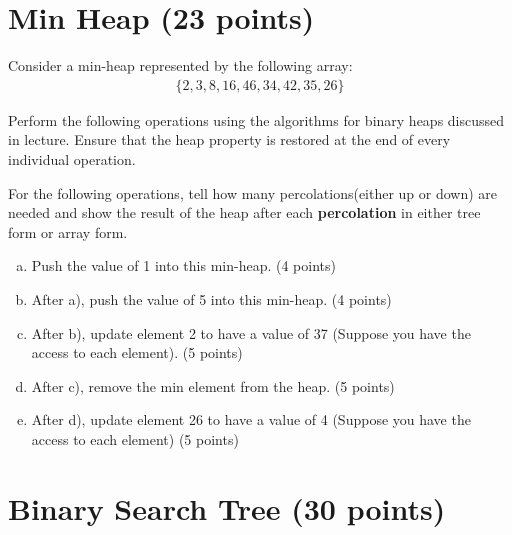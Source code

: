 \documentclass[11pt]{exam}
\begin{document}
\section{Min Heap (23 points)}
Consider a min-heap represented by the following array:
\begin{align*}
\{2, 3, 8, 16, 46, 34, 42, 35, 26\}
\end{align*}

Perform the following operations using the algorithms for binary heaps discussed in lecture. Ensure that the heap property is restored at the end of every individual operation.

For the following operations, tell how many percolations(either up or down) are needed and show the result of the heap after each \textbf{percolation} in either tree form or array form. 

\begin{enumerate}[a)]
\item Push the value of 1 into this min-heap. (4 points)
\begin{solution}
\end{solution}

\item After a), push the value of 5 into this min-heap. (4 points)
\begin{solution}
\end{solution}

\item After b), update element 2 to have a value of 37 (Suppose you have the access to each element). (5 points)
\begin{solution}
\end{solution}

\item After c), remove the min element from the heap. (5 points)
\begin{solution}
\end{solution}

\item After d), update element 26 to have a value of 4 (Suppose you have the access to each element) (5 points)
\begin{solution}
\end{solution}

\end{enumerate}

\section{Binary Search Tree (30 points)}
\end{document}
